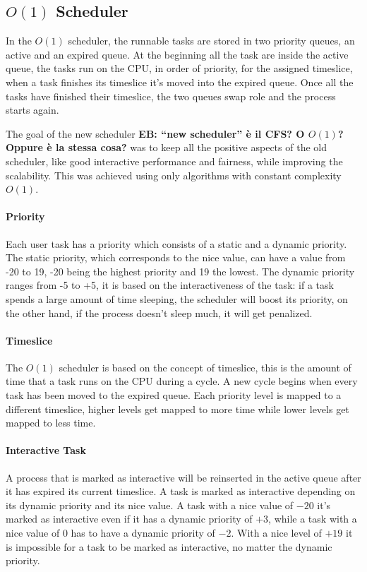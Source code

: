 \documentclass[10pt]{book}
\newcommand{\mycomment}[1]{\textbf{#1}}  %
\begin{document}
\subsection{$O(1)$ Scheduler}
In the $O(1)$ scheduler, the runnable tasks are stored in two priority queues, an active and an expired queue. At the beginning all the task are inside the active queue, the tasks run on the CPU, in order of priority, for the assigned timeslice, when a task finishes its timeslice it's moved into the expired queue. Once all the tasks have finished their timeslice, the two queues swap role and the process starts again.

The goal of the new scheduler \mycomment{EB: ``new scheduler'' \`e il CFS? O $O(1)$? Oppure \`e la stessa cosa?} was to keep all the positive aspects of the old scheduler, like good interactive performance and fairness, while improving the scalability. This was achieved using only algorithms with constant complexity $O(1)$.

\paragraph{Priority} %
Each user task has a priority which consists of a static and a dynamic priority. The static priority, which corresponds to the nice value, can have a value from -20 to 19, -20 being the highest priority and 19 the lowest. The dynamic priority ranges from -5 to +5, it is based on the interactiveness of the task: if a task spends a large amount of time sleeping, the scheduler will boost its priority, on the other hand, if the process doesn't sleep much, it will get penalized.

\paragraph{Timeslice} %
The $O(1)$ scheduler is based on the concept of timeslice, this is the amount of time that a task runs on the CPU during a cycle. A new cycle begins when every task has been moved to the expired queue.  Each priority level is mapped to a different timeslice, higher levels get mapped to more time while lower levels get mapped to less time. 

\paragraph{Interactive Task}
A process that is marked as interactive will be reinserted in the
active queue after it has expired its current timeslice. A task is
marked as interactive depending on its dynamic priority and its nice
value. A task with a nice value of $-20$ it's marked as interactive
even if it has a dynamic priority of $+3$, while a task with a nice
value of $0$ has to have a dynamic priority of $-2$. With a nice level
of $+19$ it is impossible for a task to be marked as interactive, no
matter the dynamic priority.
\end{document}
